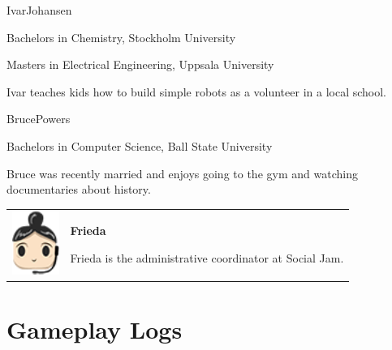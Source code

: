 \documentclass[letterpaper]{article}
\begin{document}
\begin{character}{Ivar}{Johansen}
{\item Bachelors in Chemistry, Stockholm University
 \item Masters in Electrical Engineering, Uppsala University}
Ivar teaches kids how to build simple robots as a volunteer in a local school.
\end{character}

\begin{character}{Bruce}{Powers}
{\item Bachelors in Computer Science, Ball State University}
Bruce was recently married and enjoys going to the gym and watching documentaries about history.
\end{character}

\begin{tabular}{p{1.25in}p{4in}}
\includegraphics[width=0.6in]{images/Frieda.png}
&
\textbf{Frieda}

Frieda is the administrative coordinator at Social Jam.
\end{tabular}

\clearpage
\section{Gameplay Logs}

\end{document}
